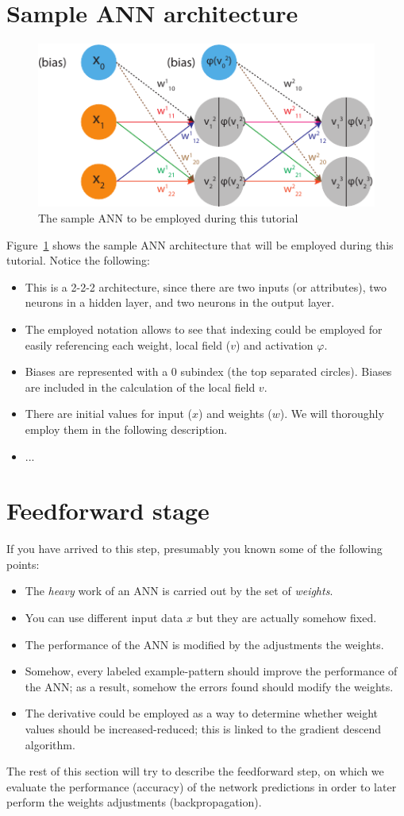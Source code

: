 \documentclass[10pt]{article}
\begin{document}
\section{Sample ANN architecture}

\begin{figure}
	\centering
	\includegraphics[scale=1.3]{figures/base-ann}
	\caption{The sample ANN to be employed during this tutorial}
	\label{fig:sample-ann}
\end{figure}

Figure~\ref{fig:sample-ann} shows the sample ANN architecture that will be employed during this tutorial.
Notice the following:
\begin{itemize}
	\item This is a 2-2-2 architecture, since there are two inputs (or attributes), two neurons in a hidden layer, and two neurons in the output layer.
	\item The employed notation allows to see that indexing could be employed for easily referencing each weight, local field ($v$) and activation $\varphi$. 
	\item Biases are represented with a 0 subindex (the top separated circles). Biases are included in the calculation of the local field $v$.
	\item There are initial values for input ($x$) and weights ($w$). We will thoroughly employ them in the following description.
	\item ...
\end{itemize}

\section{Feedforward stage}
If you have arrived to this step, presumably you known some of the following points:
\begin{itemize}
	\item The \emph{heavy} work of an ANN is carried out by the set of \emph{weights}.
	\item You can use different input data $x$ but they are actually somehow fixed.
	\item The performance of the ANN is modified by the adjustments the weights.
	\item Somehow, every labeled example-pattern should improve the performance of the ANN; as a result, somehow the errors found should modify the weights.
	\item The derivative could be employed as a way to determine whether weight values should be increased-reduced; this is linked to the gradient descend algorithm.
\end{itemize}

The rest of this section will try to describe the feedforward step, on which we evaluate the performance (accuracy) of the network predictions in order to later perform the weights adjustments (backpropagation).
\end{document}
